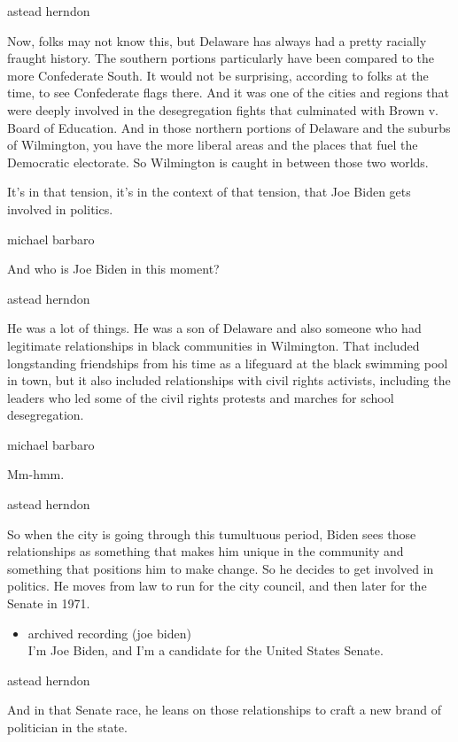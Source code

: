 astead herndon

Now, folks may not know this, but Delaware has always had a pretty
racially fraught history. The southern portions particularly have been
compared to the more Confederate South. It would not be surprising,
according to folks at the time, to see Confederate flags there. And it
was one of the cities and regions that were deeply involved in the
desegregation fights that culminated with Brown v. Board of Education.
And in those northern portions of Delaware and the suburbs of
Wilmington, you have the more liberal areas and the places that fuel the
Democratic electorate. So Wilmington is caught in between those two
worlds.

It's in that tension, it's in the context of that tension, that Joe
Biden gets involved in politics.

michael barbaro

And who is Joe Biden in this moment?

astead herndon

He was a lot of things. He was a son of Delaware and also someone who
had legitimate relationships in black communities in Wilmington. That
included longstanding friendships from his time as a lifeguard at the
black swimming pool in town, but it also included relationships with
civil rights activists, including the leaders who led some of the civil
rights protests and marches for school desegregation.

michael barbaro

Mm-hmm.

astead herndon

So when the city is going through this tumultuous period, Biden sees
those relationships as something that makes him unique in the community
and something that positions him to make change. So he decides to get
involved in politics. He moves from law to run for the city council, and
then later for the Senate in 1971.

\begin{itemize}
\tightlist
\item
  archived recording (joe biden)\\
  I'm Joe Biden, and I'm a candidate for the United States Senate.
\end{itemize}

astead herndon

And in that Senate race, he leans on those relationships to craft a new
brand of politician in the state.

